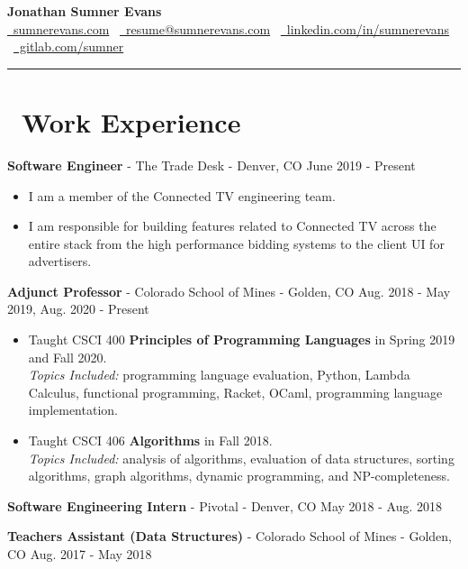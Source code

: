 \documentclass[10pt,letterpaper]{article}
\begin{document}
\begin{center}
    {\huge\textbf{Jonathan Sumner Evans}} \\
    \vspace{3pt}
    \href{https://sumnerevans.com}{\faGlobe\ sumnerevans.com}
    \textbar\ \href{mailto:resume@sumnerevans.com}{\faEnvelope\ resume@sumnerevans.com}
    \textbar\ \href{https://www.linkedin.com/in/sumnerevans}{\faLinkedin\ linkedin.com/in/sumnerevans}
    \textbar\ \href{https://gitlab.com/sumner}{\faGitlab\ gitlab.com/sumner}
    \rule{\textwidth}{0.5pt}
\end{center}

\section*{\faBriefcase\ Work Experience}
\textbf{Software Engineer} - The Trade Desk - Denver, CO
\hfill June 2019 - Present
\begin{itemize}
    \item I am a member of the Connected TV engineering team.
    \item I am responsible for building features related to Connected TV across
        the entire stack from the high performance bidding systems to the client
        UI for advertisers.
\end{itemize}

\textbf{Adjunct Professor} - Colorado School of Mines - Golden, CO
\hfill Aug. 2018 - May 2019, Aug. 2020 - Present
\begin{itemize}
    \item Taught CSCI 400 \textbf{Principles of Programming Languages} in Spring
        2019 and Fall 2020. \\
        \textit{Topics Included:} programming language evaluation, Python,
        Lambda Calculus, functional programming, Racket, OCaml, programming
        language implementation.
    \item Taught CSCI 406 \textbf{Algorithms} in Fall 2018. \\
        \textit{Topics Included:} analysis of algorithms, evaluation of data
        structures, sorting algorithms, graph algorithms, dynamic programming,
        and NP-completeness.
\end{itemize}

\textbf{Software Engineering Intern} - Pivotal - Denver, CO
\hfill May 2018 - Aug. 2018

\vspace{2pt}
\textbf{Teachers Assistant (Data Structures)} - Colorado School of Mines -
Golden, CO \hfill Aug. 2017 - May 2018
\end{document}
